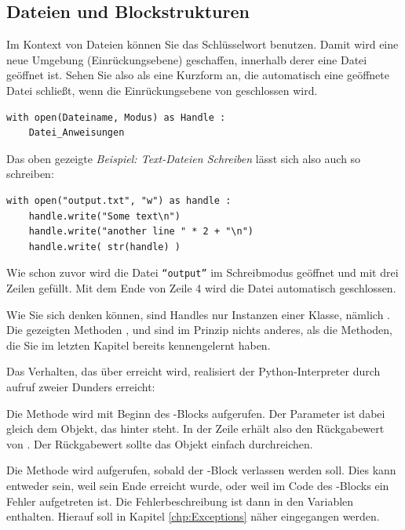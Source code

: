 \subsection{Dateien und Blockstrukturen}
Im Kontext von Dateien können Sie das Schlüsselwort  benutzen. Damit wird eine neue Umgebung (Einrückungsebene) geschaffen, innerhalb derer eine Datei geöffnet ist. Sehen Sie also  als eine Kurzform an, die automatisch eine geöffnete Datei schließt, wenn die Einrückungsebene von  geschlossen wird.

\begin{codebox}
\begin{verbatim}
with open(Dateiname, Modus) as Handle :
    Datei_Anweisungen
\end{verbatim}
\end{codebox}

Das oben gezeigte \emph{Beispiel: Text-Dateien Schreiben} lässt sich also auch so schreiben:
\begin{codebox}
\begin{verbatim}
with open("output.txt", "w") as handle :
    handle.write("Some text\n")
    handle.write("another line " * 2 + "\n")
    handle.write( str(handle) )
\end{verbatim}
\end{codebox}

Wie schon zuvor wird die Datei \texttt{\enquote{output}} im Schreibmodus geöffnet und mit drei Zeilen gefüllt. Mit dem Ende von Zeile 4 wird die Datei automatisch geschlossen.

\begin{hintbox}
Wie Sie sich denken können, sind Handles nur Instanzen einer Klasse, nämlich . Die gezeigten Methoden ,  und  sind im Prinzip nichts anderes, als die Methoden, die Sie im letzten Kapitel bereits kennengelernt haben.

Das Verhalten, das über  erreicht wird, realisiert der Python-Interpreter durch aufruf zweier Dunders erreicht:

Die Methode  wird mit Beginn des -Blocks aufgerufen. Der Parameter  ist dabei gleich dem Objekt, das hinter  steht. In der Zeile  erhält  also den Rückgabewert von . Der Rückgabewert sollte das Objekt  einfach durchreichen.

Die Methode  wird aufgerufen, sobald der -Block verlassen werden soll. Dies kann entweder sein, weil sein Ende erreicht wurde, oder weil im Code des -Blocks ein Fehler aufgetreten ist. Die Fehlerbeschreibung ist dann in den Variablen  enthalten. Hierauf soll in Kapitel \ref{chp:Exceptions} näher eingegangen werden.
\end{hintbox}

